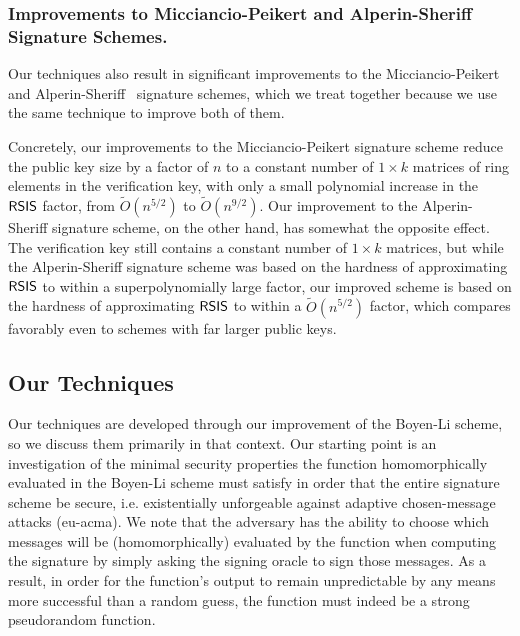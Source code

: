 \subsubsection{Improvements to Micciancio-Peikert and Alperin-Sheriff Signature Schemes.}
\label{sec:impr-micc-peik}

Our techniques also result in significant improvements to the Micciancio-Peikert~\cite{DBLP:conf/eurocrypt/MicciancioP12} and Alperin-Sheriff~\cite{DBLP:conf/pkc/Alperin-Sheriff15} signature schemes, which we treat together because we use the same technique to improve both of them. 

Concretely, our improvements to the Micciancio-Peikert signature scheme reduce the public key size by a factor of $n$ to a constant number of $1 \times k$ matrices of ring elements in the verification key, with only a small polynomial increase in the $\mathsf{RSIS}$ factor, from $\tilde{O}(n^{5/2})$ to $\tilde{O}(n^{9/2})$. 
Our improvement to the Alperin-Sheriff signature scheme, on the other hand, has somewhat the opposite effect. The verification key still contains a constant number of $1 \times k$ matrices, but while the Alperin-Sheriff signature scheme was based on the hardness of approximating $\mathsf{RSIS}$ to within a superpolynomially large factor, our improved scheme is based on the hardness of approximating $\mathsf{RSIS}$ to within a $\tilde{O}(n^{5/2})$ factor, which compares favorably even to schemes with far larger public keys. 




\subsection{Our Techniques}
\label{sec:techniq}
Our techniques are developed through our improvement of the Boyen-Li scheme, so we discuss them primarily in that context.
Our starting point is an investigation of the minimal security properties the function homomorphically evaluated in the Boyen-Li scheme must satisfy in order that the entire signature scheme be secure, i.e. existentially unforgeable against adaptive chosen-message attacks (eu-acma). We note that the adversary has the ability to choose which messages will be (homomorphically) evaluated by the function when computing the signature by simply asking the signing oracle to sign those messages. As a result, in order for the function's output to remain unpredictable by any means more successful than a random guess, the function must indeed be a strong pseudorandom function. 

